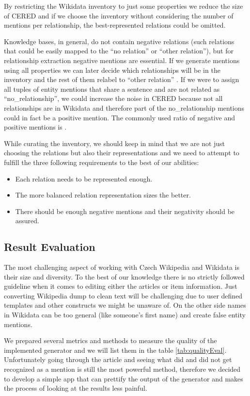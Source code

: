 By restricting the Wikidata inventory to just some properties we reduce the size of CERED and if we choose the inventory without considering the number of mentions per relationship, the best-represented relations could be omitted.

Knowledge bases, in general, do not contain negative relations (such relations that could be easily mapped to the “no relation” or “other relation”), but for relationship extraction negative mentions are essential. If we generate mentions using all properties we can later decide which relationships will be in the inventory and the rest of them relabel to “other relation” . If we were to assign all tuples of entity mentions that share a sentence and are not related as “no\_relationship”, we could increase the noise in CERED because not all relationships are in Wikidata and therefore part of the no\_relationship mentions could in fact be a positive mention. The commonly used ratio of negative and positive mentions is .

While curating the inventory, we should keep in mind that we are not just choosing the relations but also their representations and we need to attempt to fulfill the three following requirements to the best of our abilities:
\begin{itemize}
\item Each relation needs to be represented enough.
\item The more balanced relation representation sizes the better.
\item There should be enough negative mentions and their negativity should be assured. 

\end{itemize}

\subsection{Result Evaluation}
The most challenging aspect of working with Czech Wikipedia and Wikidata is their size and diversity. To the best of our knowledge there is no strictly followed guideline when it comes to editing either the articles or item information. Just converting Wikipedia dump to clean text will be challenging due to user defined templates and other constructs we might be unaware of. On the other side names in Wikidata can be too general (like someone's first name) and create false entity mentions. 

We prepared several metrics and methods to measure the quality of the implemented generator and we will list them in the table \ref{tab:qualityEval}. Unfortunately going through the article and seeing what did and did not get recognized as a mention is still the most powerful method, therefore we decided to develop a simple app that can prettify the output of the generator and makes the process of looking at the results less painful.  


